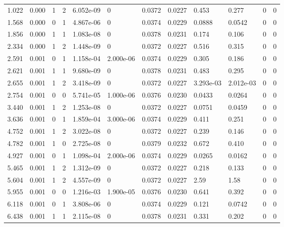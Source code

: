 \documentclass[preview]{standalone}
\begin{document}
{{\begin{tabular}{L{1.2cm}C{1.2cm} C{0.3cm}C{0.5cm} C{1.4cm}C{1.4cm} C{1.4cm}C{1.4cm} C{1.6cm}C{1.6cm} C{1.6cm}C{1.6cm}}
  1.022  &  0.000  & 1     &  2 &  6.052e-09  & 0  &  0.0372&   0.0227& 0.453 & 0.277   &  0 & 0  \\ 
  1.568  &  0.000  & 0     &  1 &  4.867e-06  & 0  &  0.0374&   0.0229& 0.0888 & 0.0542   &  0 & 0  \\ 
  1.856  &  0.000  & 1     &  1 &  1.083e-08  & 0  &  0.0378&   0.0231& 0.174 & 0.106   &  0 & 0  \\ 
  2.334  &  0.000  & 1     &  2 &  1.448e-09  & 0  &  0.0372&   0.0227& 0.516 & 0.315   &  0 & 0  \\ 
  2.591  &  0.001  & 0     &  1 &  1.158e-04  & 2.000e-06  &  0.0374&   0.0229& 0.305 & 0.186   &  0 & 0  \\ 
  2.621  &  0.001  & 1     &  1 &  9.680e-09  & 0  &  0.0378&   0.0231& 0.483 & 0.295   &  0 & 0  \\ 
  2.655  &  0.001  & 1     &  2 &  3.418e-09  & 0  &  0.0372&   0.0227& 3.293e-03 & 2.012e-03   &  0 & 0  \\ 
  2.754  &  0.001  & 0     &  0 &  5.741e-05  & 1.000e-06  &  0.0376&   0.0230& 0.0433 & 0.0264   &  0 & 0  \\ 
  3.440  &  0.001  & 1     &  2 &  1.253e-08  & 0  &  0.0372&   0.0227& 0.0751 & 0.0459   &  0 & 0  \\ 
  3.636  &  0.001  & 0     &  1 &  1.859e-04  & 3.000e-06  &  0.0374&   0.0229& 0.411 & 0.251   &  0 & 0  \\ 
  4.752  &  0.001  & 1     &  2 &  3.022e-08  & 0  &  0.0372&   0.0227& 0.239 & 0.146   &  0 & 0  \\ 
  4.782  &  0.001  & 1     &  0 &  2.725e-08  & 0  &  0.0379&   0.0232& 0.672 & 0.410   &  0 & 0  \\ 
  4.927  &  0.001  & 0     &  1 &  1.098e-04  & 2.000e-06  &  0.0374&   0.0229& 0.0265 & 0.0162   &  0 & 0  \\ 
  5.465  &  0.001  & 1     &  2 &  1.312e-09  & 0  &  0.0372&   0.0227& 0.218 & 0.133   &  0 & 0  \\ 
  5.604  &  0.001  & 1     &  2 &  4.557e-09  & 0  &  0.0372&   0.0227& 2.59 & 1.58   &  0 & 0  \\ 
  5.955  &  0.001  & 0     &  0 &  1.216e-03  & 1.900e-05  &  0.0376&   0.0230& 0.641 & 0.392   &  0 & 0  \\ 
  6.118  &  0.001  & 0     &  1 &  3.808e-06  & 0  &  0.0374&   0.0229& 0.121 & 0.0742   &  0 & 0  \\ 
  6.438  &  0.001  & 1     &  1 &  2.115e-08  & 0  &  0.0378&   0.0231& 0.331 & 0.202   &  0 & 0  \\ 

\end{tabular}}}
\end{document}
